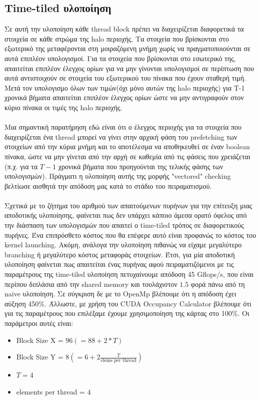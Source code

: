 \documentclass[11pt,a4paper]{article}
\begin{document}
\subsection{Time-tiled υλοποίηση}
Σε αυτή την υλοποίηση κάθε thread block πρέπει να διαχειρίζεται διαφορετικά τα στοιχεία σε κάθε στρώμα της halo περιοχής. Τα στοιχεία που βρίσκονται
στο εξωτερικό της μεταφέρονται στη μοιραζόμενη μνήμη χωρίς να πραγματοποιούνται σε αυτά επιπλέον υπολογισμοί. Για τα στοιχεία που βρίσκονται στο 
εσωτερικό της, απαιτείται επιπλέον έλεγχος ορίων για να μην γίνονται υπολογισμοί σε περίπτωση που αυτά αντιστοιχούν σε στοιχεία του εξωτερικού του 
πίνακα που έχουν σταθερή τιμή. Μετά τον υπολογισμο όλων των τιμών(όχι μόνο αυτών της halo περιοχής) για T-1 χρονικά βήματα απαιτείται επιπλέον έλεγχος
ορίων ώστε να μην αντιγραφούν στον κύριο πίνακα οι τιμές της halo περιοχής. \\ \\
Μια σημαντική παρατήρηση εδώ είναι ότι ο έλεγχος περιοχής για τα στοιχεία που διαχειρίζεται ένα thread μπορεί να γίνει στην αρχική φάση του prefetching των στοιχείων από την κύρια μνήμη και το αποτέλεσμα να αποθηκευθεί σε έναν boolean πίνακα, ώστε να μην γίνεται από την αρχή σε καθεμία από τις φάσεις που χρειάζεται (π.χ. για τα $T - 1$ χρονικά βήματα που προηγούνται της τελικής φάσης των υπολογισμών). Πράγματι η υλοποίηση αυτής της μορφής "vectored" checking βελτίωσε αισθητά την απόδοση μας κατά το στάδιο του πειραματισμού. \\ \\
Σχετικά με το ζήτημα του αριθμού των απαιτούμενων πυρήνων για την επίτευξη μιας αποδοτικής υλοποίησης, φαίνεται πως δεν υπάρχει κάποιο άμεσα ορατό όφελος από την διάσπαση των υπολογισμών που απαιτεί ο time-tiled τρόπος σε διαφορετικούς πυρήνες. Ένα επιπρόσθετο κόστος που θα επέφερε αυτό είναι προφανώς το κόστος του kernel launching. Ακόμη, ανάλογα την υλοποίηση πιθανώς να είχαμε μεγαλύτερο branching ή μεγαλύτερο κόστος μεταφοράς στοιχείων. Έτσι, για μία αποδοτική υλοποίηση φαίνεται πως απαιτείται ένας πυρήνας αφού πειραματιζόμενοι με τις παραμέτρους της time-tiled υλοποίηση πετυχαίνουμε απόδοση 45 Gflops/s, που είναι περίπου διπλάσια από την 
shared memory και τουλάχιστον $1.5$  φορά πάνω από τη naive υλοποίηση. Σε σύγκριση δε με το OpenMp βλέπουμε ότι η απόδοση έχει αύξηση 450\%. Άλλωστε, με χρήση του CUDA Occupancy Calculator βλέπουμε ότι για τις παραμέτρους που επιλέξαμε έχουμε χρησιμοποίηση της κάρτας στο 100\%. Οι παράμετροι αυτές είναι: 
\begin{itemize}
	\item Block Size X = $96 (= 88 + 2 * T) $ 
	\item Block Size Y = $8 \left( = 6 + 2 \frac{T}{\text{elems per thread}}\right) $
	\item $ T = 4 $
	\item elements per thread = $4$
\end{itemize}
\newpage
\end{document}
